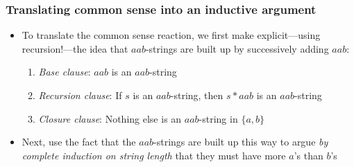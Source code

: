 \begin{frame}
\frametitle{Translating common sense into an inductive argument}

\begin{itemize}[<+->]
\item To translate the common sense reaction, we first make explicit---using recursion!---the idea that $aab$-strings are built up by successively adding $aab$:

\begin{enumerate}
\item {\emph{Base clause}}: $aab$ is an $aab$-string

\item {\emph{Recursion clause}}: If $s$ is an $aab$-string, then $s*aab$ is an $aab$-string

\item {\emph{Closure clause}}: Nothing else is an $aab$-string in $\{a,b\}$
\end{enumerate}

\item Next, use the fact that the $aab$-strings are built up this way to argue \emph{by complete induction on string length} that they must have more $a$'s than $b$'s


\end{itemize} 
\end{frame}

